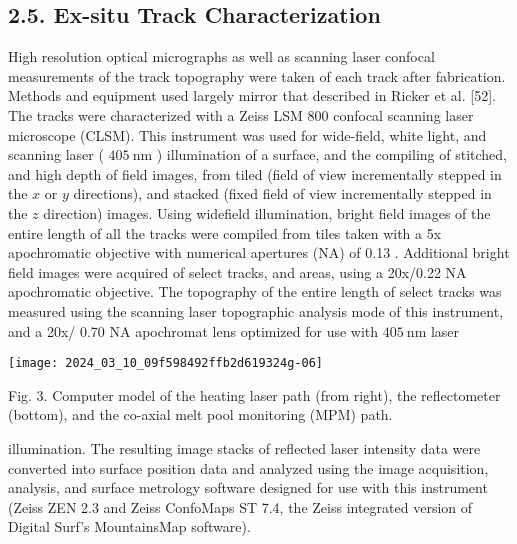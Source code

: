 \documentclass[10pt]{article}
\begin{document}
\subsection*{2.5. Ex-situ Track Characterization}
High resolution optical micrographs as well as scanning laser confocal measurements of the track topography were taken of each track after fabrication. Methods and equipment used largely mirror that described in Ricker et al. [52]. The tracks were characterized with a Zeiss LSM 800 confocal scanning laser microscope (CLSM). This instrument was used for wide-field, white light, and scanning laser ( $405 \mathrm{~nm}$ ) illumination of a surface, and the compiling of stitched, and high depth of field images, from tiled (field of view incrementally stepped in the $x$ or $y$ directions), and stacked (fixed field of view incrementally stepped in the $z$ direction) images. Using widefield illumination, bright field images of the entire length of all the tracks were compiled from tiles taken with a 5x apochromatic objective with numerical apertures (NA) of 0.13 . Additional bright field images were acquired of select tracks, and areas, using a 20x/0.22 NA apochromatic objective. The topography of the entire length of select tracks was measured using the scanning laser topographic analysis mode of this instrument, and a 20x/ 0.70 NA apochromat lens optimized for use with $405 \mathrm{~nm}$ laser

\begin{center}
\texttt{[image: 2024\_03\_10\_09f598492ffb2d619324g-06]}
\end{center}

Fig. 3. Computer model of the heating laser path (from right), the reflectometer (bottom), and the co-axial melt pool monitoring (MPM) path.

illumination. The resulting image stacks of reflected laser intensity data were converted into surface position data and analyzed using the image acquisition, analysis, and surface metrology software designed for use with this instrument (Zeiss ZEN 2.3 and Zeiss ConfoMaps ST 7.4, the Zeiss integrated version of Digital Surf's MountainsMap software).
\end{document}
